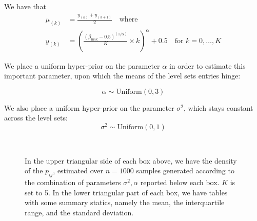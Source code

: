 \documentclass[11pt]{amsart}
\begin{document}
We have that
\begin{align}
\mu_{(k)} &= \frac{y_{(k)}+y_{(k+1)}}{2}  \quad \text{where } \\ 
y_{(k)} &= \left( \frac{(\beta_{\max} - 0.5)^{(1/\alpha)}}{K} \times k \right)^\alpha + 0.5 \quad \text{for } k = 0, \ldots, K
\end{align}


We place a uniform hyper-prior on the parameter $\alpha$ in order to estimate this important parameter, upon which the means of the level sets entries hinge:

\[
\alpha \sim \text{Uniform}(0, 3)
\]

We also place a uniform hyper-prior on the parameter $\sigma^2$, which stays constant across the level sets:
\[
\sigma^2 \sim \text{Uniform}(0, 1)
\]

\begin{figure}[h]
    \centering
    \hfill
    \hfill
    \\[2ex]\hfill
    \hfill
    \caption{In the upper triangular side of each box above, we have the density of the $p_{ij}$, estimated over $n=1000$ samples generated according to the combination of parameters $\sigma^2 ,\alpha$ reported below each box. $K$ is set to 5. In the lower triangular part of each box, we have tables with some summary statics, namely the mean, the interquartile range, and the standard deviation.}
    \label{fig:all_images}
\end{figure}
\end{document}
